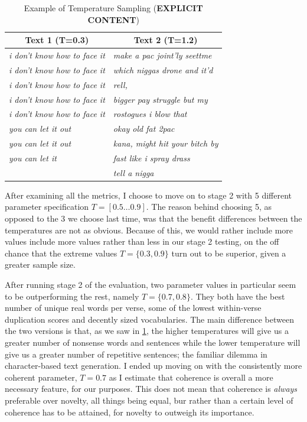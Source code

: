 \begin{table}[htb!]
    \begin{center}
    \caption{Example of Temperature Sampling (\textbf{EXPLICIT CONTENT})}
    \vspace{6pt}
    \bgroup
    \def\arraystretch{1.5}
    \label{tab:temperatureexample}
    \begin{tabular}{|l|l|}
        \hline
        \multicolumn{1}{|c|}{\textbf{Text 1 (T=0.3)}} & \multicolumn{1}{|c|}{\textbf{Text 2 (T=1.2)}} \\\hline
        \textit{i don’t know how to face it} & \textit{make a pac joint’ly seettme}\\
        \textit{i don’t know how to face it} & \textit{which niggas drone and it’d}\\
        \textit{i don’t know how to face it} & \textit{rell,}\\
        \textit{i don’t know how to face it} & \textit{bigger pay struggle but my}\\
        \textit{i don’t know how to face it} & \textit{rostogues i blow that}\\
        \textit{you can let it out} & \textit{okay old fat 2pac}\\
        \textit{you can let it out} & \textit{kana,  might hit your bitch by}\\
        \textit{you can let it} & \textit{fast like i spray drass}\\
        & \textit{tell a nigga}\\\hline
    \end{tabular}
    \egroup
    \end{center}
\end{table}

After examining all the metrics, I choose to move on to stage 2 with 5 different parameter specification $T=[0.5\ldots0.9]$. The reason behind choosing 5, as opposed to the 3 we choose last time, was that the benefit differences between the temperatures are not as obvious. Because of this, we would rather include more values include more values rather than less in our stage 2 testing, on the off chance that the extreme values $T=\{0.3,0.9\}$ turn out to be superior, given a greater sample size.

After running stage 2 of the evaluation, two parameter values in particular seem to be outperforming the rest, namely $T=\{0.7,0.8\}$.  They both have the best number of unique real words per verse, some of the lowest within-verse duplication scores and decently sized vocabularies. The main difference between the two versions is that, as we saw in \cref{tab:temperatureexample}, the higher temperatures will give us a greater number of nonsense words and sentences while the lower temperature will  give us a greater number of repetitive sentences; the familiar dilemma in character-based text generation. I ended up moving on with the consistently more coherent parameter, $T=0.7$ as I estimate that coherence is overall a more necessary feature, for our purposes. This does not mean that coherence is \textit{always} preferable over novelty, all things being equal, bur rather than a certain level of coherence has to be attained, for novelty to outweigh its importance.

